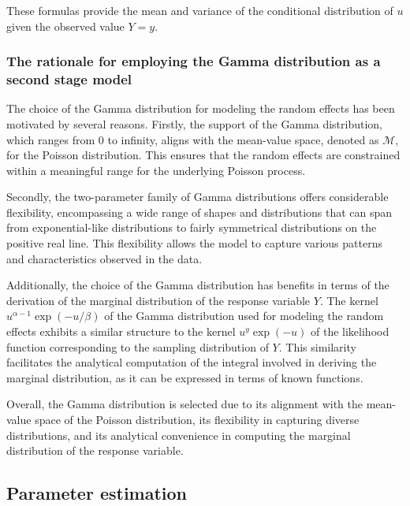 \documentclass[preprint, 3p,
authoryear]{elsarticle} %
\begin{document}
These formulas provide the mean and variance of the conditional
distribution of \(u\) given the observed value \(Y=y\).

\hypertarget{the-rationale-for-employing-the-gamma-distribution-as-a-second-stage-model}{%
\subsubsection{The rationale for employing the Gamma distribution as a
second stage
model}\label{the-rationale-for-employing-the-gamma-distribution-as-a-second-stage-model}}

The choice of the Gamma distribution for modeling the random effects has
been motivated by several reasons. Firstly, the support of the Gamma
distribution, which ranges from 0 to infinity, aligns with the
mean-value space, denoted as \(\mathcal{M}\), for the Poisson
distribution. This ensures that the random effects are constrained
within a meaningful range for the underlying Poisson process.

Secondly, the two-parameter family of Gamma distributions offers
considerable flexibility, encompassing a wide range of shapes and
distributions that can span from exponential-like distributions to
fairly symmetrical distributions on the positive real line. This
flexibility allows the model to capture various patterns and
characteristics observed in the data.

Additionally, the choice of the Gamma distribution has benefits in terms
of the derivation of the marginal distribution of the response variable
\(Y\). The kernel \(u^{\alpha-1}\exp(-u/\beta)\) of the Gamma
distribution used for modeling the random effects exhibits a similar
structure to the kernel \(u^y\exp(-u)\) of the likelihood function
corresponding to the sampling distribution of \(Y\). This similarity
facilitates the analytical computation of the integral involved in
deriving the marginal distribution, as it can be expressed in terms of
known functions.

Overall, the Gamma distribution is selected due to its alignment with
the mean-value space of the Poisson distribution, its flexibility in
capturing diverse distributions, and its analytical convenience in
computing the marginal distribution of the response variable.

\hypertarget{parameter-estimation}{%
\subsection{Parameter estimation}\label{parameter-estimation}}
\end{document}
